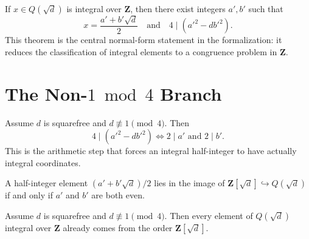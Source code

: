 \begin{theorem}%
\label{thm:halfint-normal-form}%
\leanok
{}
If $x \in Q(\sqrt d)$ is integral over\/ $\mathbf{Z}$, then there exist integers
$a', b'$ such that
\[
  x = \frac{a' + b' \sqrt d}{2}
  \quad\text{and}\quad
  4 \mid (a'^2 - d b'^2).
\]
This theorem is the central normal-form statement in the formalization: it
reduces the classification of integral elements to a congruence problem in
$\mathbf{Z}$.
\end{theorem}

\section{The Non-\texorpdfstring{$1 \bmod 4$}{1 mod 4} Branch}

\begin{lemma}%
\label{lem:mod4-ne-one}
\leanok
Assume $d$ is squarefree and $d \not\equiv 1 \pmod 4$. Then
\[
  4 \mid (a'^2 - d b'^2)
  \iff
  2 \mid a' \text{ and } 2 \mid b'.
\]
This is the arithmetic step that forces an integral half-integer to have
actually integral coordinates.
\end{lemma}

\begin{lemma}%
\label{lem:zsqrtd-carrier}
\leanok
A half-integer element $(a' + b' \sqrt d)/2$ lies in the image of
$\mathbf{Z}[\sqrt d] \hookrightarrow Q(\sqrt d)$ if and only if $a'$ and $b'$ are
both even.
\end{lemma}

\begin{theorem}%
\label{thm:integral-in-zsqrtd}%
\leanok
{}
Assume $d$ is squarefree and $d \not\equiv 1 \pmod 4$. Then every element of
$Q(\sqrt d)$ integral over\/ $\mathbf{Z}$ already comes from the order
$\mathbf{Z}[\sqrt d]$.
\end{theorem}

